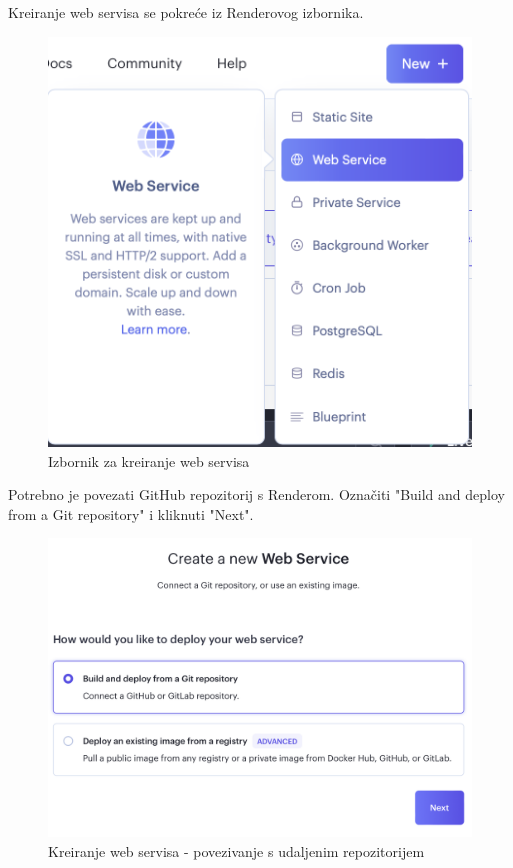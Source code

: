 			\pagebreak
			Kreiranje web servisa se pokreće iz Renderovog izbornika.
			\begin{figure}[H]
				\includegraphics[scale=0.4]{slike/deploy/backend00.png} %
				\centering
				\caption{Izbornik za kreiranje web servisa}
				\label{fig:promjene}
			\end{figure}
			Potrebno je povezati GitHub repozitorij s Renderom. Označiti "Build and deploy from a Git repository" i kliknuti "Next".
			\begin{figure}[H]
				\includegraphics[scale=0.4]{slike/deploy/backend1.png} %
				\centering
				\caption{Kreiranje web servisa - povezivanje s udaljenim repozitorijem}
				\label{fig:promjene}
			\end{figure}
